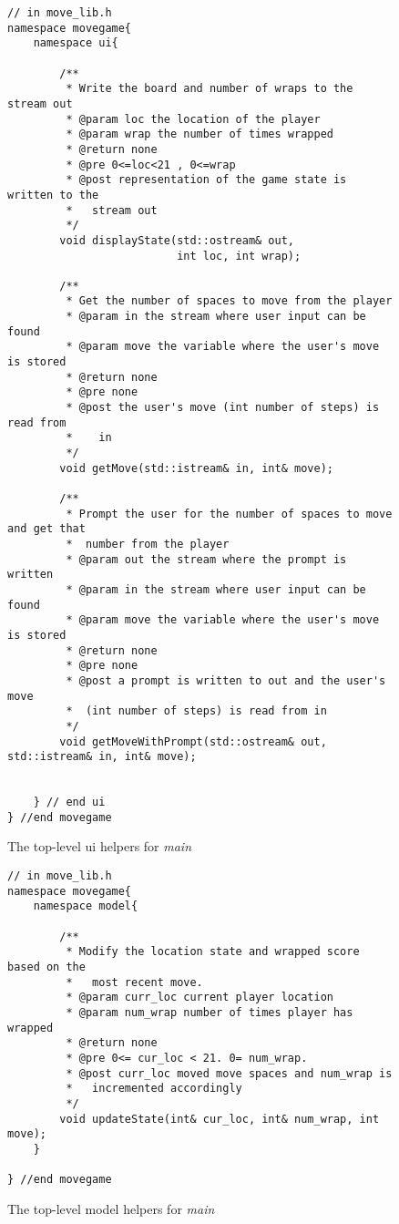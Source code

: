 \documentclass[nobib]{tufte-handout}
\begin{document}
\begin{figure}[!htbp]
\begin{lstlisting}
// in move_lib.h
namespace movegame{
	namespace ui{
		
		/**
		 * Write the board and number of wraps to the stream out
		 * @param loc the location of the player
		 * @param wrap the number of times wrapped
		 * @return none
		 * @pre 0<=loc<21 , 0<=wrap
		 * @post representation of the game state is written to the
		 *   stream out
		 */
		void displayState(std::ostream& out,
						  int loc, int wrap);

		/**
		 * Get the number of spaces to move from the player
		 * @param in the stream where user input can be found
		 * @param move the variable where the user's move is stored
		 * @return none
		 * @pre none
		 * @post the user's move (int number of steps) is read from
		 *    in
		 */						  
		void getMove(std::istream& in, int& move);		
		
		/**
		 * Prompt the user for the number of spaces to move and get that 
		 *  number from the player 
		 * @param out the stream where the prompt is written
		 * @param in the stream where user input can be found
		 * @param move the variable where the user's move is stored
		 * @return none
		 * @pre none
		 * @post a prompt is written to out and the user's move 
		 *  (int number of steps) is read from in
		 */						  
		void getMoveWithPrompt(std::ostream& out, std::istream& in, int& move);		
	
	
	} // end ui
} //end movegame	
\end{lstlisting}
\caption{The top-level ui helpers for \textit{main}}
\label{fig:top1}
\end{figure}

\begin{figure}[!htbp]
\begin{lstlisting}
// in move_lib.h
namespace movegame{
	namespace model{
	
		/**
		 * Modify the location state and wrapped score based on the 
		 *   most recent move.
		 * @param curr_loc current player location
		 * @param num_wrap number of times player has wrapped
		 * @return none
		 * @pre 0<= cur_loc < 21. 0= num_wrap. 
		 * @post curr_loc moved move spaces and num_wrap is 
		 *   incremented accordingly 
		 */
		void updateState(int& cur_loc, int& num_wrap, int move);
	}

} //end movegame

\end{lstlisting}
\caption{The top-level model helpers for \textit{main}}
\label{fig:top2}
\end{figure}
\end{document}
